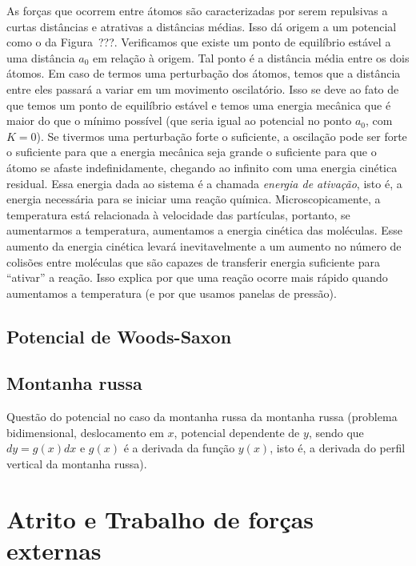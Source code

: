 As forças que ocorrem entre átomos são caracterizadas por serem repulsivas a curtas distâncias e atrativas a distâncias médias. Isso dá origem a um potencial como o da Figura~???. Verificamos que existe um ponto de equilíbrio estável a uma distância $a_0$ em relação à origem. Tal ponto é a distância média entre os dois átomos. Em caso de termos uma perturbação dos átomos, temos que a distância entre eles passará a variar em um movimento oscilatório. Isso se deve ao fato de que temos um ponto de equilíbrio estável e temos uma energia mecânica que é maior do que o mínimo possível (que seria igual ao potencial no ponto $a_0$, com $K=0$). Se tivermos uma perturbação forte o suficiente, a oscilação pode ser forte o suficiente para que a energia mecânica seja grande o suficiente para que o átomo se afaste indefinidamente, chegando ao infinito com uma energia cinética residual. Essa energia dada ao sistema é a chamada \emph{energia de ativação}, isto é, a energia necessária para se iniciar uma reação química. Microscopicamente, a temperatura está relacionada à velocidade das partículas, portanto, se aumentarmos a temperatura, aumentamos a energia cinética das moléculas. Esse aumento da energia cinética levará inevitavelmente a um aumento no número de colisões entre moléculas que são capazes de transferir energia suficiente para ``ativar'' a reação. Isso explica por que uma reação ocorre mais rápido quando aumentamos a temperatura (e por que usamos panelas de pressão).

\subsection{Potencial de Woods-Saxon}

\subsection{Montanha russa}

Questão do potencial no caso da montanha russa da montanha russa (problema bidimensional, deslocamento em $x$, potencial dependente de $y$, sendo que $dy = g(x) dx$ e $g(x)$ é a derivada da função $y(x)$, isto é, a derivada do perfil vertical da montanha russa).

\section{Atrito e Trabalho de forças externas}

